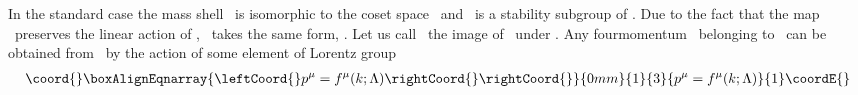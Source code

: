 \documentclass[a4paper,12pt]{article}
\begin{document}
In the standard case the mass shell \coordHE{}\ is isomorphic to the coset space \coordHE{}\ and \coordHE{}\ is
a stability subgroup of \coordHE{}. Due to the fact that the map \coordHE{}\ preserves the linear action of \coordHE{}, 
\coordHE{}\ takes the same form, \coordHE{}. Let us call \coordHE{}\ 
the image of \coordHE{}\ under \coordHE{}. Any
fourmomentum \myHighlight{$p$}\coordHE{}\ belonging to \myHighlight{$\tilde{\Sigma}_M$}\coordHE{}\ can be obtained from \coordHE{}\ by the action of some element
of Lorentz group
\begin{eqnarray}\coord{}\boxAlignEqnarray{\leftCoord{}
p^{\mu}=f^{\mu}(k;\Lambda )\rightCoord{}\label{w4}
\rightCoord{}}{0mm}{1}{3}{
p^{\mu}=f^{\mu}(k;\Lambda )}{1}\coordE{}\end{eqnarray}
\end{document}

